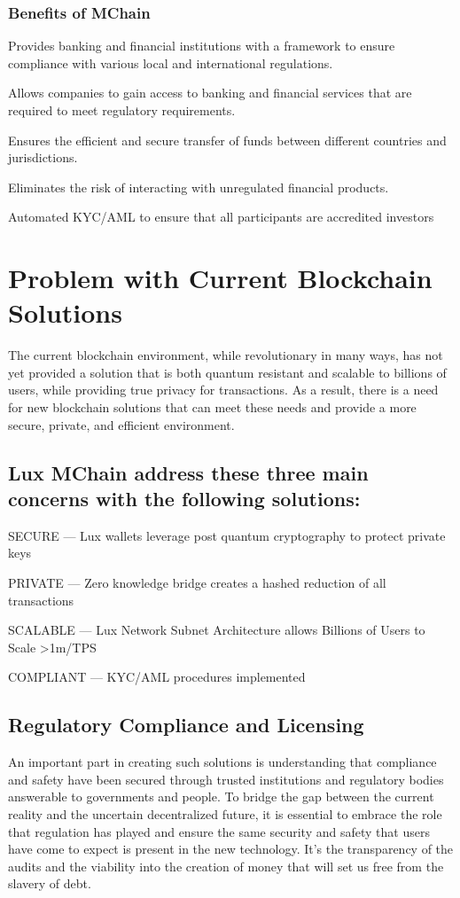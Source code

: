 \documentclass[11pt]{article}
\begin{document}
\subsubsection{Benefits of MChain}

Provides banking and financial institutions with a framework to ensure compliance with various local and international regulations.


Allows companies to gain access to banking and financial services that are required to meet regulatory requirements.


Ensures the efficient and secure transfer of funds between different countries and jurisdictions.


Eliminates the risk of interacting with unregulated financial products.


Automated KYC/AML to ensure that all participants are accredited investors


\section{Problem with Current Blockchain Solutions}

The current blockchain environment, while revolutionary in many ways, has not yet provided a solution that is both quantum resistant and scalable to billions of users, while providing true privacy for transactions. As a result, there is a need for new blockchain solutions that can meet these needs and provide a more secure, private, and efficient environment.


\subsection{Lux MChain address these three main concerns with the following solutions:}

SECURE --- Lux wallets leverage post quantum cryptography to protect private keys


PRIVATE --- Zero knowledge bridge creates a hashed reduction of all transactions


SCALABLE --- Lux Network Subnet Architecture allows Billions of Users to Scale >1m/TPS


COMPLIANT --- KYC/AML procedures implemented


\subsection{Regulatory Compliance and Licensing}

An important part in creating such solutions is understanding that compliance and safety have been secured through trusted institutions and regulatory bodies answerable to governments and people. To bridge the gap between the current reality and the uncertain decentralized future, it is essential to embrace the role that regulation has played and ensure the same security and safety that users have come to expect is present in the new technology. It's the transparency of the audits and the viability into the creation of money that will set us free from the slavery of debt.
\end{document}
